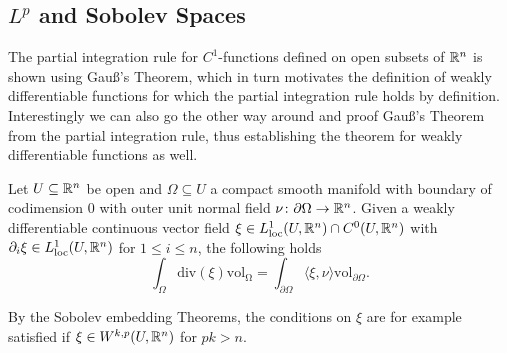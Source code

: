 \subsection{$L^p$ and Sobolev Spaces}

The partial integration rule for $C^1$-functions defined on open subsets of $\mathbb{R}^n$ is shown using Gauß's Theorem, which in turn motivates the definition of weakly differentiable functions for which the partial integration rule holds by definition. Interestingly we can also go the other way around and proof Gauß's Theorem from the partial integration rule, thus establishing the theorem for weakly differentiable functions as well.

\begin{theorem}
    \label{funkana:thm:gauß}
    Let $U \subseteq \mathbb{R}^n$ be open and $\Omega \subseteq U$ a compact smooth manifold with boundary of codimension $0$ with outer unit normal field $\nu \colon \partial\Omega \to \mathbb{R}^n$. Given a weakly differentiable continuous vector field $\xi \in L_{\mathrm{loc}}^1(U,\mathbb{R}^n) \cap C^0(U,\mathbb{R}^n)$ with $\partial_i\xi \in L_{\mathrm{loc}}^1(U,\mathbb{R}^n)$ for $1 \leq i \leq n$, the following holds 
    \[
    \int_{\Omega}\mathrm{div}(\xi)\mathrm{vol_{\Omega}} = \int_{\partial\Omega}\langle\xi,\nu\rangle \mathrm{vol}_{\partial\Omega}.
    \]
\end{theorem}

\begin{remark}
    By the Sobolev embedding Theorems, the conditions on $\xi$ are for example satisfied if $\xi \in W^{k,p}(U,\mathbb{R}^n)$ for $pk > n$.
\end{remark}

